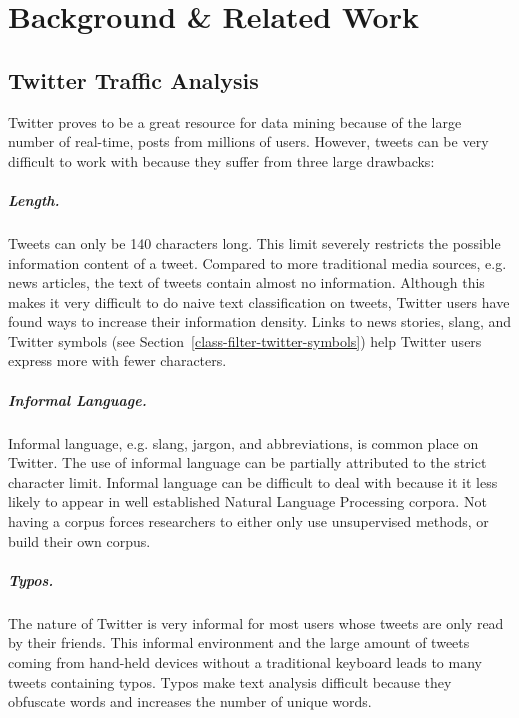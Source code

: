 \documentclass[12pt]{ucthesis}
\begin{document}
\chapter{Background \& Related Work}
\label{background-related-work}


\section{Twitter Traffic Analysis}
\label{background-twitter}
Twitter proves to be a great resource for data mining because of the large number of real-time, posts from millions of users.
However, tweets can be very difficult to work with because they suffer from three large drawbacks:

\paragraph{Length.}
Tweets can only be 140 characters long. This limit severely restricts the possible information content of a tweet.
Compared to more traditional media sources, e.g. news articles, the text of tweets contain almost no information.
Although this makes it very difficult to do naive text classification on tweets, Twitter users have found ways to increase their information density.
Links to news stories, slang, and Twitter symbols (see Section~\ref{class-filter-twitter-symbols}) help Twitter users express more with fewer characters.

\paragraph{Informal Language.}
Informal language, e.g. slang, jargon, and abbreviations, is common place on Twitter.
The use of informal language can be partially attributed to the strict character limit.
Informal language can be difficult to deal with because it it less likely to appear in well established
Natural Language Processing corpora. Not having a corpus forces researchers to either only use unsupervised methods, or
build their own corpus.

\paragraph{Typos.}
The nature of Twitter is very informal for most users whose tweets are only read by their friends.
This informal environment and the large amount of tweets coming from hand-held devices without a traditional keyboard leads to many tweets containing typos.
Typos make text analysis difficult because they obfuscate words and increases the number of unique words.
\end{document}
